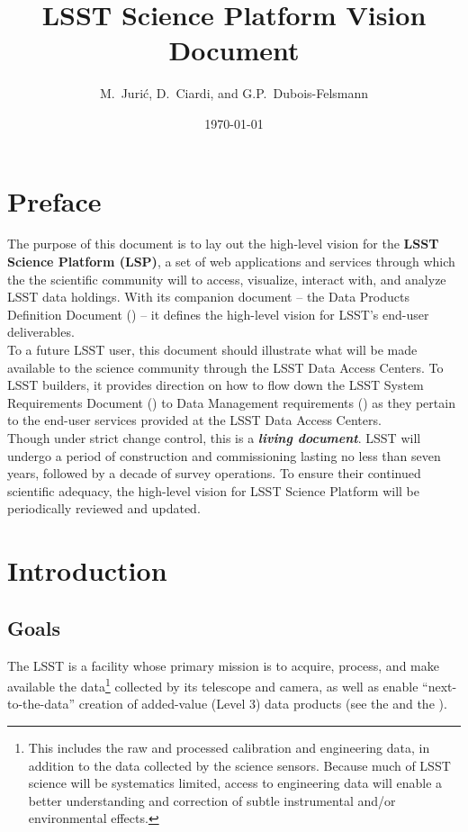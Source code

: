 \documentclass[DM,lsstdraft,toc]{lsstdoc}
\title[LSST Science Platform]{LSST Science Platform Vision Document}
\author{
M.~Juri\'c,
D.~Ciardi,
and
G.P.~Dubois-Felsmann
}
\date{\today}
\begin{document}
\maketitle

\section{Preface}

The purpose of this document is to lay out the high-level vision for the \textbf{LSST Science Platform (LSP)}, a set of web applications and services through which the the scientific community will to access, visualize, interact with, and analyze LSST data holdings. With its companion document -- the Data Products Definition Document (\DPDD) -- it defines the high-level vision for LSST's end-user deliverables.
\\

To a future LSST user, this document should illustrate what will be made available to the science community through the LSST Data Access Centers. To LSST builders, it provides direction on how to flow down the LSST System Requirements Document (\LSR) to Data Management requirements (\DMSR) as they pertain to the end-user services provided at the LSST Data Access Centers.
\\

Though under strict change control, this is a \textbf\emph{living document}. LSST will undergo a period of construction  and commissioning lasting no less than seven years, followed by a decade of survey operations. To ensure their continued scientific adequacy, the high-level vision for LSST Science Platform will be periodically reviewed and updated.

\clearpage

\section{Introduction}

\subsection{Goals}

The LSST is a facility whose primary mission is to acquire, process, and
make available the data\footnote{This includes the raw and processed calibration and engineering data, in addition to the data collected by the science sensors. Because much of LSST science will be systematics limited, access to engineering data will enable a better understanding and correction of subtle instrumental and/or environmental effects.} collected by its telescope and camera, as well as enable ``next-to-the-data'' creation of added-value (Level 3) data products
(see the \SRD and the \LSR).
\end{document}
